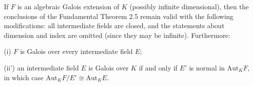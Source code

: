 If $F$ is an algebraic Galois extension of $K$ (possibly infinite dimensional), then the conclusions of the Fundamental Theorem 2.5 remain valid with the following modifications: all intermediate fields are closed, and the statements about dimension and index are omitted (since they may be infinite). Furthermore:

(i) $F$ is Galois over every intermediate field $E$;

(ii') an intermediate field $E$ is Galois over $K$ if and only if $E'$ is normal in $\mathrm{Aut}_K F$, in which case $\mathrm{Aut}_K F / E' \cong \mathrm{Aut}_K E$.
